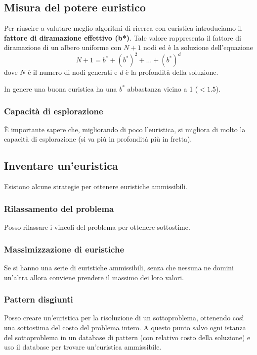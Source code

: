 \subsection{Misura del potere euristico}
Per riuscire a valutare meglio algoritmi di ricerca con euristica introduciamo il
\textbf{fattore di diramazione effettivo (b*)}. Tale valore rappresenta il fattore di diramazione
di un albero uniforme con $N + 1$ nodi ed \`e la soluzione dell'equazione
\[ N + 1 = b^* + (b^*)^2 + \dots + (b^*)^d \] dove $N$ \`e il numero di nodi generati e $d$ \`e
la profondit\`a della soluzione.

In genere una buona euristica ha una $b^*$ abbastanza vicino a 1 ($< 1.5$).

\subsubsection{Capacit\`a di esplorazione}
\`E importante sapere che, migliorando di poco l'euristica, si migliora di molto la capacit\`a
di esplorazione (si va pi\`u in profondit\`a pi\`u in fretta).

\subsection{Inventare un'euristica}
Esistono alcune strategie per ottenere euristiche ammissibili.

\subsubsection{Rilassamento del problema}
Posso rilassare i vincoli del problema per ottenere sottostime.

\subsubsection{Massimizzazione di euristiche}
Se si hanno una serie di euristiche ammissibili, senza che nessuna ne domini un'altra allora
conviene prendere il massimo dei loro valori.

\subsubsection{Pattern disgiunti}
Posso creare un'euristica per la risoluzione di un sottoproblema, ottenendo cos\`i una sottostima
del costo del problema intero. A questo punto salvo ogni istanza del sottoproblema in un database
di pattern (con relativo costo della soluzione) e uso il database per trovare un'euristica
ammissibile.

